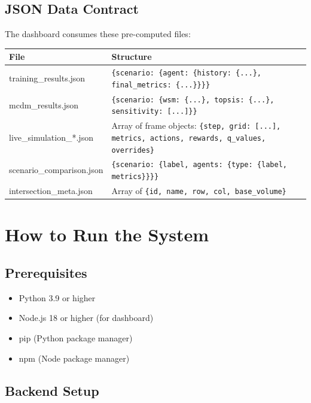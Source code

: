 \documentclass[12pt, a4paper]{article}
\begin{document}
\subsection{JSON Data Contract}

The dashboard consumes these pre-computed files:

\begin{longtable}{p{5cm}p{7cm}}
    \toprule
    \textbf{File} & \textbf{Structure} \\
    \midrule
    training\_results.json & \texttt{\{scenario: \{agent: \{history: \{...\}, final\_metrics: \{...\}\}\}\}} \\
    mcdm\_results.json & \texttt{\{scenario: \{wsm: \{...\}, topsis: \{...\}, sensitivity: [...]\}\}} \\
    live\_simulation\_*.json & Array of frame objects: \texttt{\{step, grid: [...], metrics, actions, rewards, q\_values, overrides\}} \\
    scenario\_comparison.json & \texttt{\{scenario: \{label, agents: \{type: \{label, metrics\}\}\}\}} \\
    intersection\_meta.json & Array of \texttt{\{id, name, row, col, base\_volume\}} \\
    \bottomrule
\end{longtable}

\section{How to Run the System}

\subsection{Prerequisites}

\begin{itemize}[nosep]
    \item Python 3.9 or higher
    \item Node.js 18 or higher (for dashboard)
    \item pip (Python package manager)
    \item npm (Node package manager)
\end{itemize}

\subsection{Backend Setup}
\end{document}
